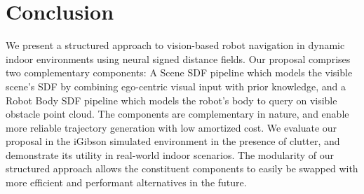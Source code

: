 \documentclass[letterpaper, 10 pt, conference]{ieeeconf}  %
\begin{document}
\section{Conclusion}

We present a structured approach to vision-based robot navigation in dynamic indoor environments using neural signed distance fields.
Our proposal comprises two complementary components: A Scene SDF pipeline which models the visible scene's SDF by combining ego-centric visual input with prior knowledge, and a Robot Body SDF pipeline which models the robot's body to query on visible obstacle point cloud.
The components are complementary in nature, and enable more reliable trajectory generation with low amortized cost.
We evaluate our proposal in the iGibson simulated environment in the presence of clutter, and demonstrate its utility in real-world indoor scenarios.
The modularity of our structured approach allows the constituent components to easily be swapped with more efficient and performant alternatives in the future.





\end{document}
